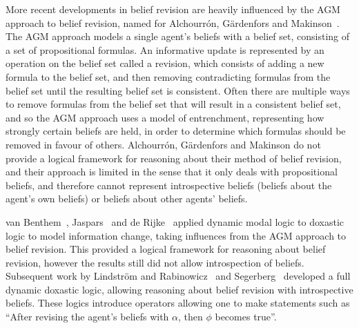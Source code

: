 More recent developments in belief revision are heavily influenced by the AGM approach to belief revision, named for Alchourr{\'o}n, G{\"a}rdenfors and Makinson~\cite{alchourron:1985}.
The AGM approach models a single agent's beliefs with a belief set, consisting of a set of propositional formulas.
An informative update is represented by an operation on the belief set called a revision, which consists of adding a new formula to the belief set, and then removing contradicting formulas from the belief set until the resulting belief set is consistent.
Often there are multiple ways to remove formulas from the belief set that will result in a consistent belief set, and so the AGM approach uses a model of entrenchment, representing how strongly certain beliefs are held, in order to determine which formulas should be removed in favour of others.
Alchourr{\'o}n, G{\"a}rdenfors and Makinson do not provide a logical framework for reasoning about their method of belief revision, and their approach is limited in the sense that it only deals with propositional beliefs, and therefore cannot represent introspective beliefs (beliefs about the agent's own beliefs) or beliefs about other agents' beliefs. 

van Benthem~\cite{vanbenthem:1989, vanbenthem:1994, vanbenthem:1996}, Jaspars~\cite{jaspars:1994} and de Rijke~\cite{derijke:1994} applied dynamic modal logic to doxastic logic to model information change, taking influences from the AGM approach to belief revision.
This provided a logical framework for reasoning about belief revision, however the results still did not allow introspection of beliefs. 
Subsequent work by Lindstr{\"o}m and Rabinowicz~\cite{lindstrom:1999a, lindstrom:1999b} and Segerberg~\cite{segerberg:1999a, segerberg:1999b} developed a full dynamic doxastic logic, allowing reasoning about belief revision with introspective beliefs.
These logics introduce operators allowing one to make statements such as ``After revising the agent's beliefs with $\alpha$, then $\phi$ becomes true''.

